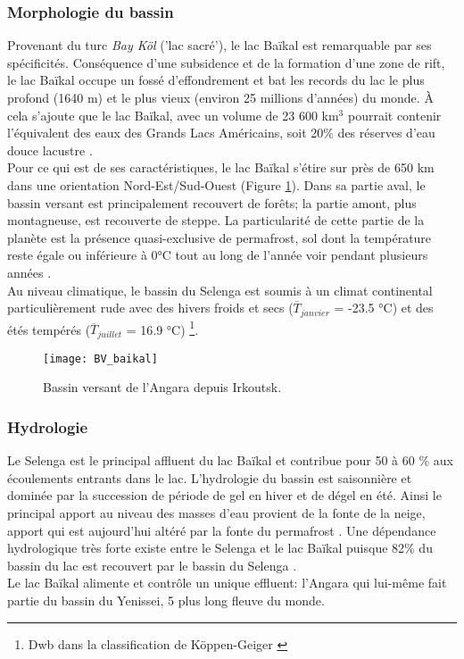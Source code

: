 \subsubsection*{{\selectfont Morphologie du bassin}}

Provenant du turc \textit{Bay Köl} ('lac sacré'), le lac Baïkal est remarquable par ses spécificités. Conséquence d'une subsidence et de la formation d'une zone de rift, le lac Baïkal occupe un fossé d'effondrement et bat les records du lac le plus profond (1640 m) et le plus vieux (environ 25 millions d'années) du monde. À cela s'ajoute que le lac Baïkal, avec un volume de 23 600 km$^{3}$ pourrait contenir l'équivalent des eaux des Grands Lacs Américains, soit 20\% des réserves d'eau douce lacustre \citep{brunello2003, messager2016}.\\
Pour ce qui est de ses caractéristiques, le lac Baïkal s'étire sur près de 650 km dans une orientation Nord-Est/Sud-Ouest (Figure \ref{bv_baikal}). Dans sa partie aval, le bassin versant est principalement recouvert de forêts; la partie amont, plus montagneuse, est recouverte de steppe. La particularité de cette partie de la planète est la présence quasi-exclusive de permafrost, sol dont la température reste égale ou inférieure à 0°C tout au long de l'année voir pendant plusieurs années \citep{tornqvist2014}. \\
Au niveau climatique, le bassin du Selenga est soumis à un climat continental  particulièrement rude avec des hivers froids et secs ($\overline{T}_{janvier}$ = -23.5 °C) et des étés tempérés ($\overline{T}_{juillet}$ = 16.9 °C) \citep{tornqvist2014} \footnote{Dwb dans la classification de Köppen-Geiger \citep{beck2018}}.

\begin{figure}[h!]
\centering
\texttt{[image: BV\_baikal]}
\caption{Bassin versant de l'Angara depuis Irkoutsk.}
\label{bv_baikal}
\end{figure}

\subsubsection*{{\selectfont Hydrologie}}
\label{sec:hydrologie_baikal}

Le Selenga est le principal affluent du lac Baïkal et contribue pour 50 à 60 \% aux écoulements entrants dans le lac. L'hydrologie du bassin est saisonnière et dominée par la succession de période de gel en hiver et de dégel en été. Ainsi le principal apport au niveau des masses d'eau provient de la fonte de la neige, apport qui est aujourd'hui altéré par la fonte du permafrost \citep{karlsson2012}. Une dépendance hydrologique très forte existe entre le Selenga et le lac Baïkal puisque 82\% du bassin du lac est recouvert par le bassin du Selenga \citep{nadmitov2015}. \\
Le lac Baïkal alimente et contrôle un unique effluent: l'Angara qui lui-même fait partie du bassin du Yenissei, 5\ieme{} plus long fleuve du monde.

